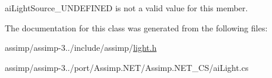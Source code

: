 ai\+Light\+Source\+\_\+\+U\+N\+D\+E\+F\+I\+N\+E\+D is not a valid value for this member. 

The documentation for this class was generated from the following files\+:\begin{DoxyCompactItemize}
\item 
assimp/assimp-\/3../include/assimp/\hyperlink{light_8h}{light.\+h}\item 
assimp/assimp-\/3../port/\+Assimp.\+N\+E\+T/\+Assimp.\+N\+E\+T\+\_\+\+C\+S/ai\+Light.\+cs\end{DoxyCompactItemize}
